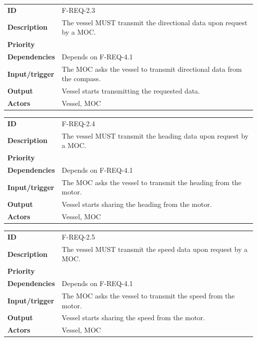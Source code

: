 \begin{table}[H]
	\centering
	\begin{tabularx}{\textwidth}{ l X }
		\rowcolor[HTML]{E7E7E7}
		\textbf{ID} & F-REQ-2.3 \\
		\textbf{Description} & The vessel MUST transmit the directional data upon request by a MOC. \\
		\rowcolor[HTML]{E7E7E7}
		\textbf{Priority} & \priohigh \\
		\textbf{Dependencies} & Depends on F-REQ-4.1 \\
		\rowcolor[HTML]{E7E7E7}
		\textbf{Input/trigger} & The MOC asks the vessel to transmit directional data from the compass. \\
		\textbf{Output} & Vessel starts transmitting the requested data. \\
		\rowcolor[HTML]{E7E7E7}
		\textbf{Actors} & Vessel, MOC \\
	\end{tabularx}
	\label{table:f-req-2.3}
\end{table}

\begin{table}[H]
	\centering
	\begin{tabularx}{\textwidth}{ l X }
		\rowcolor[HTML]{E7E7E7}
		\textbf{ID} & F-REQ-2.4 \\
		\textbf{Description} & The vessel MUST transmit the heading data upon request by a MOC. \\
		\rowcolor[HTML]{E7E7E7}
		\textbf{Priority} & \priohigh \\
		\textbf{Dependencies} & Depends on F-REQ-4.1 \\
		\rowcolor[HTML]{E7E7E7}
		\textbf{Input/trigger} & The MOC asks the vessel to transmit the heading from the motor. \\
		\textbf{Output} & Vessel starts sharing the heading from the motor. \\
		\rowcolor[HTML]{E7E7E7}
		\textbf{Actors} & Vessel, MOC \\
	\end{tabularx}
	\label{table:f-req-2.4}
\end{table}

\begin{table}[H]
	\centering
	\begin{tabularx}{\textwidth}{ l X }
		\rowcolor[HTML]{E7E7E7}
		\textbf{ID} & F-REQ-2.5 \\
		\textbf{Description} & The vessel MUST transmit the speed data upon request by a MOC. \\
		\rowcolor[HTML]{E7E7E7}
		\textbf{Priority} & \priohigh \\
		\textbf{Dependencies} & Depends on F-REQ-4.1 \\
		\rowcolor[HTML]{E7E7E7}
		\textbf{Input/trigger} & The MOC asks the vessel to transmit the speed from the motor. \\
		\textbf{Output} & Vessel starts sharing the speed from the motor. \\
		\rowcolor[HTML]{E7E7E7}
		\textbf{Actors} & Vessel, MOC \\
	\end{tabularx}
	\label{table:f-req-2.5}
\end{table}

